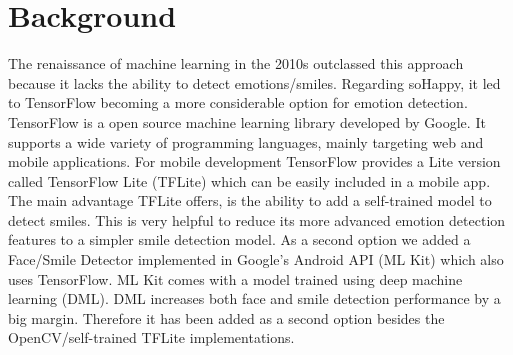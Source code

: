 \section{Background} \label{sec:background}
The renaissance of machine learning in the 2010s outclassed this approach because it lacks the ability to detect emotions/smiles.
Regarding soHappy, it led to TensorFlow becoming a more considerable option for emotion detection.
TensorFlow is a open source machine learning library developed by Google.
It supports a wide variety of programming languages, mainly targeting web and mobile applications.
For mobile development TensorFlow provides a Lite version called TensorFlow Lite (TFLite) which can be easily included in a mobile app.
The main advantage TFLite offers, is the ability to add a self-trained model to detect smiles. This is very helpful to reduce its more advanced emotion detection features to a simpler smile detection model.
As a second option we added a Face/Smile Detector implemented in Google's Android API (ML Kit) which also uses TensorFlow.
ML Kit comes with a model trained using deep machine learning (DML).
DML increases both face and smile detection performance by a big margin.
Therefore it has been added as a second option besides the OpenCV/self-trained TFLite implementations.

